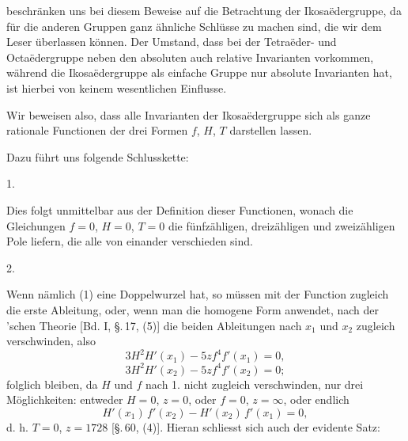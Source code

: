 beschränken uns bei diesem Beweise auf die Betrachtung der Ikosa\"edergruppe, da für die anderen Gruppen ganz ähnliche Schlüsse zu machen sind, die wir dem Leser überlassen können. Der Umstand, dass bei der Tetra\"eder- und Octa\"edergruppe neben den absoluten auch relative Invarianten vorkommen, während die Ikosa\"edergruppe als einfache Gruppe nur absolute Invarianten hat, ist hierbei von keinem wesentlichen Einflusse.

Wir beweisen also, dass alle Invarianten der Ikosa\"edergruppe sich als ganze rationale Functionen der drei Formen $f$, $H$, $T$ darstellen lassen.

Dazu führt uns folgende Schlusskette:

1. 

Dies folgt unmittelbar aus der Definition dieser Functionen, wonach die Gleichungen $f = 0$, $H = 0$, $T = 0$ die fünfzähligen, dreizähligen und zweizähligen Pole liefern, die alle von einander verschieden sind.

2. 

Wenn nämlich (1) eine Doppelwurzel hat, so müssen mit der Function zugleich die erste Ableitung, oder, wenn man die homogene Form anwendet, nach der 'schen Theorie [Bd. I, \S.\,17, (5)] die beiden Ableitungen nach $x_1$ und $x_2$ zugleich verschwinden, also
\[
3H^2 H'(x_1) - 5z f^4 f'(x_1) = 0,
\]
\[
3H^2 H'(x_2) - 5z f^4 f'(x_2) = 0;
\]
folglich bleiben, da $H$ und $f$ nach 1. nicht zugleich verschwinden, nur drei Möglichkeiten: entweder $H = 0$, $z = 0$, oder $f = 0$, $z = \infty$, oder endlich
\[
H'(x_1)\,f'(x_2) - H'(x_2)\,f'(x_1) = 0,
\]
d. h. $T = 0$, $z = 1728$ [\S.\,60, (4)]. Hieran schliesst sich auch der evidente Satz:
